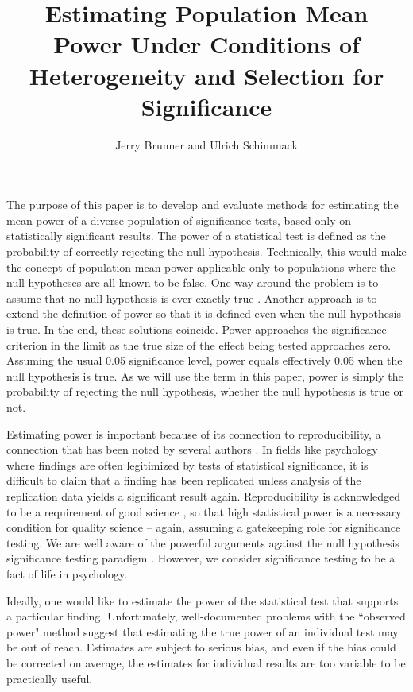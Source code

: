 \documentclass[jou]{apa6} %
\title{Estimating Population Mean Power Under Conditions of Heterogeneity and Selection for Significance}
\author{Jerry Brunner and Ulrich Schimmack}
\affiliation{University of Toronto Mississauga}
\begin{document}
\maketitle

The purpose of this paper is to develop and evaluate methods for estimating the mean power of a diverse population of significance tests, based only on statistically significant results. The power of a statistical test is defined \parencite{NeymanPearson1933} as the probability of correctly rejecting the null hypothesis. Technically, this would make the concept of population mean power applicable only to populations where the null hypotheses are all known to be false. One way around the problem is to assume that no null hypothesis is ever exactly true \parencite{SterlingEtAl1995}. Another approach is to extend the definition of power so that it is defined even when the null hypothesis is true. In the end, these solutions coincide. Power approaches the significance criterion in the limit as the true size of the effect being tested approaches zero. Assuming the usual 0.05 significance level, power equals effectively 0.05 when the null hypothesis is true. As we will use the term in this paper, power is simply the probability of rejecting the null hypothesis, whether the null hypothesis is true or not. 

Estimating power is important because of its connection to reproducibility, a connection that has been noted by several authors \parencite{GreenwaldEtAl1996, Posavac2002, YuanMaxwell2005}. In fields like psychology where findings are often legitimized by tests of statistical significance, it is difficult to claim that a finding has been replicated unless analysis of the replication data yields a significant result again. Reproducibility is acknowledged to be a requirement of good science \parencite{Bunge1998, Popper1959}, so that high statistical power is a necessary condition for quality science -- again, assuming a gatekeeping role for significance testing. 
We are well aware of the powerful arguments against the null hypothesis significance testing paradigm \parencite{Rozenbloom1960, BergerSelke1987, Cohen1994, Schervish1996, HarlowEtAl1997, Nickerson2000, Krueger2001, HalseyEtAl2015}. However, we consider significance testing to be a fact of life in psychology.

Ideally, one would like to estimate the power of the statistical test that supports a particular finding. Unfortunately, well-documented problems with the ``observed power" method \parencite{Gillett1994, Thomas1997, GerrardSmithWeerakkody1998, HoenigHeisey2001, YuanMaxwell2005, BoosStefanski2012} suggest that estimating the true power of an individual test may be out of reach. Estimates are subject to serious bias, and even if the bias could be corrected on average, the estimates for individual results are too variable to be practically useful. 
\end{document}
